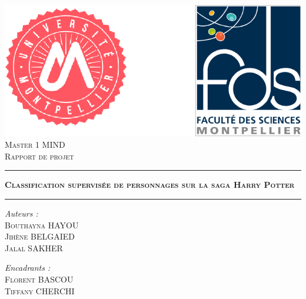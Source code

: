 \documentclass[11pt]{article}
\begin{document}
\thispagestyle{empty}
\begin{titlepage}
  \begin{sffamily}
  \begin{center}

    

   

    
    
    \includegraphics[width= 10 cm]{./figures/untitled.png}
    \\[3cm]
    \textsc{Master 1 MIND }\\
    \vspace{0.4cm}
    \textsc{Rapport de projet }\\
    \vspace{1cm}
    
    \hrule
    \vspace{0.4cm}
    { \huge \scshape \textbf{Classification supervisée de personnages sur la saga Harry Potter}}
    \vspace{0.4cm}
    \hrule
    \vspace{4 cm}
    
    

    \begin{minipage}{0.5\textwidth}
      \begin{flushleft} \Large
        \emph{Auteurs : }\\
        \textsc{Bouthayna HAYOU}\\
        \textsc{Jihène BELGAIED }\\
        \textsc{Jalal SAKHER}\\
    
      \end{flushleft}
    \end{minipage}
    \begin{minipage}{0.43\textwidth}
      \begin{flushright} \Large
        \emph{Encadrants : }\\
    \textsc{Florent BASCOU}\\
    \textsc{Tiffany CHERCHI}
      \end{flushright}
    \end{minipage}

    \vfill

  \end{center}
  \end{sffamily}
\end{titlepage}
\end{document}
